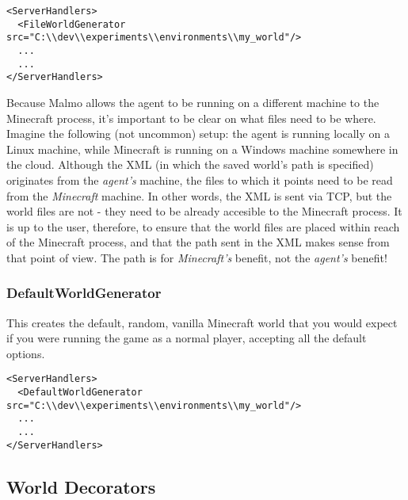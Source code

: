 \documentclass[11pt]{article} %
\begin{document}
\begin{lstlisting}[frame=lines]
<ServerHandlers>
  <FileWorldGenerator src="C:\\dev\\experiments\\environments\\my_world"/>
  ...
  ...
</ServerHandlers>
\end{lstlisting}

\begin{mdframed}[style=tipFrame]
Because Malmo allows the agent to be running on a different machine to the Minecraft process, it's important to be clear on what files need to be where. Imagine the following (not uncommon) setup: the agent is running locally on a Linux machine, while Minecraft is running on a Windows machine somewhere in the cloud. Although the XML (in which the saved world's path is specified) originates from the \emph{agent's} machine, the files to which it points need to be read from the \emph{Minecraft} machine. In other words, the XML is sent via TCP, but the world files are not - they need to be already accesible to the Minecraft process. It is up to the user, therefore, to ensure that the world files are placed within reach of the Minecraft process, and that the path sent in the XML makes sense from that point of view. The path is for \emph{Minecraft's} benefit, not the \emph{agent's} benefit!
\end{mdframed}


\subsubsection{DefaultWorldGenerator}

This creates the default, random, vanilla Minecraft world that you would expect if you were running the game as a normal player, accepting all the default options.

\begin{lstlisting}[frame=lines]
<ServerHandlers>
  <DefaultWorldGenerator src="C:\\dev\\experiments\\environments\\my_world"/>
  ...
  ...
</ServerHandlers>
\end{lstlisting}


\subsection{World Decorators}
\end{document}

